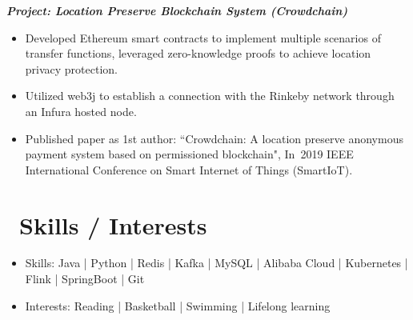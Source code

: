 \documentclass{resume}
\begin{document}

\textit{\textbf{\hspace{1em}Project: Location Preserve Blockchain System (Crowdchain)}}
\setlength{\parindent}{0em}

\begin{itemize}
  \item Developed Ethereum smart contracts to implement multiple scenarios of transfer functions, leveraged zero-knowledge proofs to achieve location privacy protection.
  \item Utilized web3j to establish a connection with the Rinkeby network through an Infura hosted node.
  \item Published paper as 1st author: ``Crowdchain: A location preserve anonymous payment system based on permissioned blockchain", In 2019 IEEE International Conference on Smart Internet of Things (SmartIoT).
\end{itemize}




\section{\faCogs\ Skills / Interests}
\begin{itemize}%
\item Skills: Java | Python | Redis | Kafka | MySQL | Alibaba Cloud | Kubernetes | Flink | SpringBoot | Git
\item Interests: Reading | Basketball | Swimming | Lifelong learning
\end{itemize}
\end{document}
